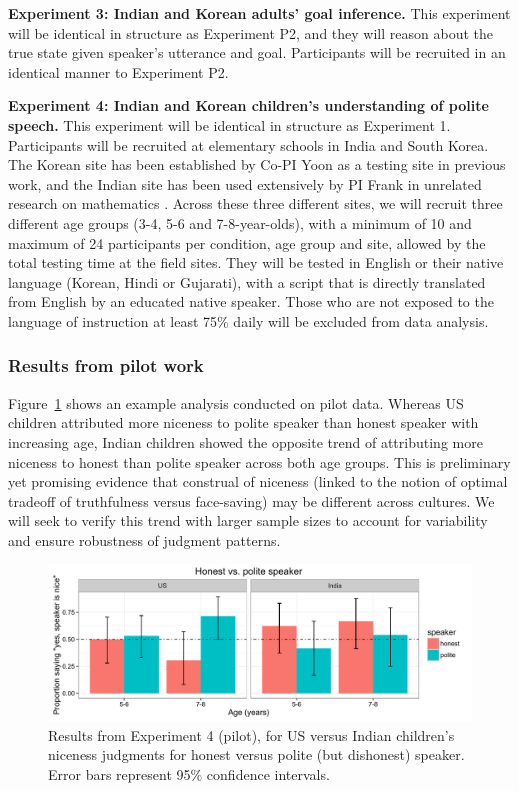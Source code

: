 {\bf Experiment 3: Indian and Korean adults' goal inference.} 
This experiment will be identical in structure as Experiment P2, and they will reason about the true state given speaker's utterance and goal. Participants will be recruited in an identical manner to Experiment P2.

{\bf Experiment 4: Indian and Korean children's understanding of polite speech.} 
This experiment will be identical in structure as Experiment 1. Participants will be recruited at elementary schools in India and South Korea. The Korean site has been established by Co-PI Yoon as a testing site in previous work, and the Indian site has been used extensively by PI Frank in unrelated research on mathematics \citep{frankbarner2012, barner2016}. Across these three different sites, we will recruit three different age groups (3-4, 5-6 and 7-8-year-olds), with a minimum of 10 and maximum of 24 participants per condition, age group and site, allowed by the total testing time at the field sites. They will be tested in English or their native language (Korean, Hindi or Gujarati), with a script that is directly translated from English by an educated native speaker. Those who are not exposed to the language of instruction at least 75\% daily will be excluded from data analysis. 

\subsubsection{Results from pilot work} 

Figure~\ref{fig:expt4} shows an example analysis conducted on pilot data. Whereas US children attributed more niceness to polite speaker than honest speaker with increasing age, Indian children showed the opposite trend of attributing more niceness to honest than polite speaker across both age groups. This is preliminary yet promising evidence that construal of niceness (linked to the notion of optimal tradeoff of truthfulness versus face-saving) may be different across cultures. We will seek to verify this trend with larger sample sizes to account for variability and ensure robustness of judgment patterns.

\begin{figure}[t]
\begin{centering}
\includegraphics[width=\textwidth]{figures/exp4.pdf}
\caption{\label{fig:expt4} Results from Experiment 4 (pilot), for US versus Indian children's niceness judgments for honest versus polite (but dishonest) speaker. Error bars represent 95\% confidence intervals.}
\end{centering}
\end{figure}

